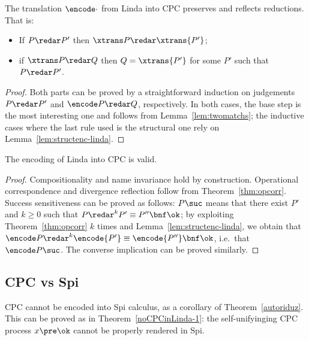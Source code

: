 \documentclass{LMCS}
\begin{document}
\begin{thm}
\label{thm:opcorr}
The translation $\encode\cdot$ from Linda into CPC preserves and reflects reductions.
That is:
\begin{itemize}
	\item If $P\redar P'$ then $\xtrans P \redar \xtrans {P'}$;
	\item if $\xtrans P \redar Q$ then $Q=\xtrans {P'}$ for some $P'$ such that $P\redar P'$.
\end{itemize}
\end{thm}
\begin{proof}
Both parts can be proved by a straightforward induction
on judgements $P \redar P'$ and $\encode P \redar Q$, respectively.
In both cases, the base step is the most interesting one and
follows from Lemma~\ref{lem:twomatchs}; the inductive
cases where the last rule used is the structural one rely on
Lemma~\ref{lem:structenc-linda}.
\end{proof}

\begin{cor}
\label{cor:valid-linda}
The encoding of Linda into CPC is valid.
\end{cor}
\begin{proof}
Compositionality and name invariance hold by construction. 
Operational correspondence and divergence reflection
follow from Theorem~\ref{thm:opcorr}. Success sensitiveness
can be proved as follows: $P \suc$ means that there exist $P'$
and $k \geq 0$ such that $P \redar^k P' \equiv P''\bnf \ok$; 
by exploiting Theorem~\ref{thm:opcorr} $k$ times 
and Lemma~\ref{lem:structenc-linda}, we obtain that $\encode P \redar^k
\encode{P'} \equiv \encode{P''}\bnf \ok$, i.e.\ that $\encode P \suc$.
The converse implication can be proved similarly. 
\end{proof}



\subsection{CPC vs Spi}
\label{subsec:spi-new}
CPC cannot be encoded into Spi calculus, as a corollary of Theorem~\ref{autoriduz}.
This can be proved as in Theorem~\ref{noCPCinLinda-1}: the self-unifyinging CPC
process $x \pre \ok$ cannot be properly rendered in Spi.
\end{document}
